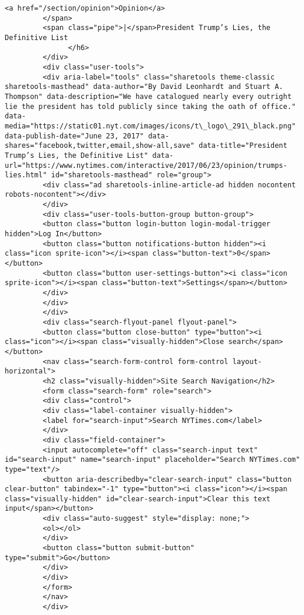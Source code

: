 \documentclass[11pt]{article}
\begin{document}
\begin{Verbatim}[commandchars=\\\{\}]
         <a href="/section/opinion">Opinion</a>
         </span>
         <span class="pipe">|</span>President Trump’s Lies, the Definitive List
               </h6>
         </div>
         <div class="user-tools">
         <div aria-label="tools" class="sharetools theme-classic sharetools-masthead" data-author="By David Leonhardt and Stuart A. Thompson" data-description="We have catalogued nearly every outright lie the president has told publicly since taking the oath of office." data-media="https://static01.nyt.com/images/icons/t\_logo\_291\_black.png" data-publish-date="June 23, 2017" data-shares="facebook,twitter,email,show-all,save" data-title="President Trump’s Lies, the Definitive List" data-url="https://www.nytimes.com/interactive/2017/06/23/opinion/trumps-lies.html" id="sharetools-masthead" role="group">
         <div class="ad sharetools-inline-article-ad hidden nocontent robots-nocontent"></div>
         </div>
         <div class="user-tools-button-group button-group">
         <button class="button login-button login-modal-trigger hidden">Log In</button>
         <button class="button notifications-button hidden"><i class="icon sprite-icon"></i><span class="button-text">0</span></button>
         <button class="button user-settings-button"><i class="icon sprite-icon"></i><span class="button-text">Settings</span></button>
         </div>
         </div>
         </div>
         <div class="search-flyout-panel flyout-panel">
         <button class="button close-button" type="button"><i class="icon"></i><span class="visually-hidden">Close search</span></button>
         <nav class="search-form-control form-control layout-horizontal">
         <h2 class="visually-hidden">Site Search Navigation</h2>
         <form class="search-form" role="search">
         <div class="control">
         <div class="label-container visually-hidden">
         <label for="search-input">Search NYTimes.com</label>
         </div>
         <div class="field-container">
         <input autocomplete="off" class="search-input text" id="search-input" name="search-input" placeholder="Search NYTimes.com" type="text"/>
         <button aria-describedby="clear-search-input" class="button clear-button" tabindex="-1" type="button"><i class="icon"></i><span class="visually-hidden" id="clear-search-input">Clear this text input</span></button>
         <div class="auto-suggest" style="display: none;">
         <ol></ol>
         </div>
         <button class="button submit-button" type="submit">Go</button>
         </div>
         </div>
         </form>
         </nav>
         </div>

\end{Verbatim}
\end{document}
